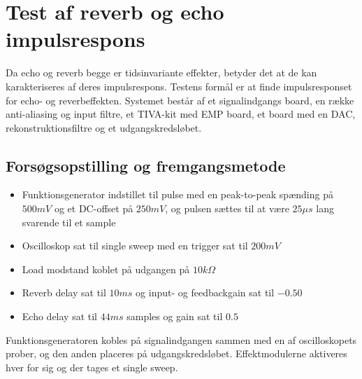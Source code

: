 \chapter{Test af reverb og echo impulsrespons}\label{sec:test_af_effekt}
Da echo og reverb begge er tidsinvariante effekter, betyder det at de kan karakteriseres af deres impulsrespons.\newline
Testens formål er at finde impulsresponset for echo- og reverbeffekten.
Systemet består af et signalindgangs board, en række anti-aliasing og input filtre, et TIVA-kit med EMP board, et board med en DAC, rekonstruktionsfiltre og et udgangskredsløbet.
\section{Forsøgsopstilling og fremgangsmetode}
\begin{itemize}
	\item Funktionsgenerator indstillet til pulse med en peak-to-peak spænding på $500\si{mV}$ og et DC-offset på $250\si{mV}$, og pulsen sættes til at være $25\si{\mu s}$ lang svarende til et sample
	\item Oscilloskop sat til single sweep med en trigger sat til $200\si{mV}$
	\item Load modstand koblet på udgangen på $10\si{k\Omega}$
	\item Reverb delay sat til $10\si{ms}$ og input- og feedbackgain sat til $-0.50$
	\item Echo delay sat til $44\si{ms}$ samples og gain sat til $0.5$
\end{itemize}
Funktionsgeneratoren kobles på signalindgangen sammen med en af oscilloskopets prober, og den anden placeres på udgangskredsløbet.\newline
Effektmodulerne aktiveres hver for sig og der tages et single sweep.
